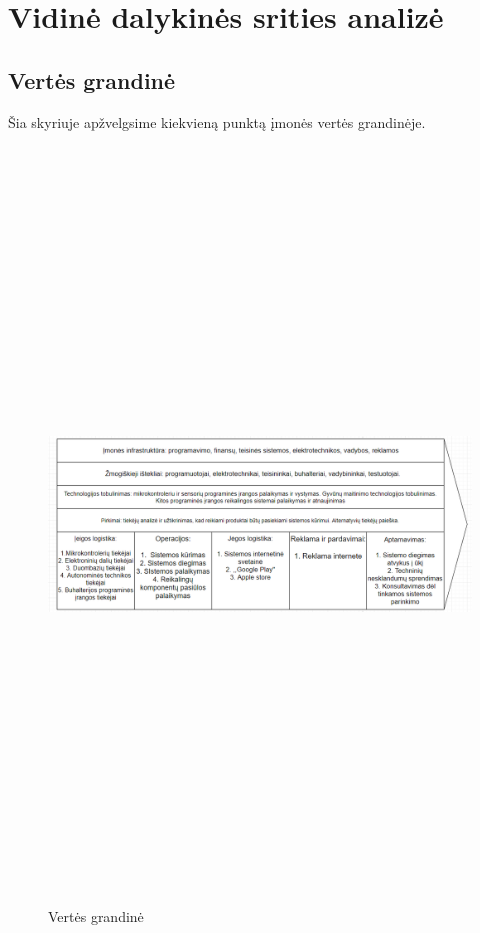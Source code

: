 \documentclass[oneside]{VUMIFPSkursinis}
\begin{document}
\section{Vidinė dalykinės srities analizė}
	\subsection{Vertės grandinė}
Šia skyriuje apžvelgsime kiekvieną punktą įmonės vertės grandinėje.
\begin{figure}[H]
		\centering	
	\includegraphics[width=18cm,height=20cm,keepaspectratio]{ValueChain.png}
	\caption{Vertės grandinė}
	\label{fig:VertėsGrandinė}
\end{figure}
\end{document}

